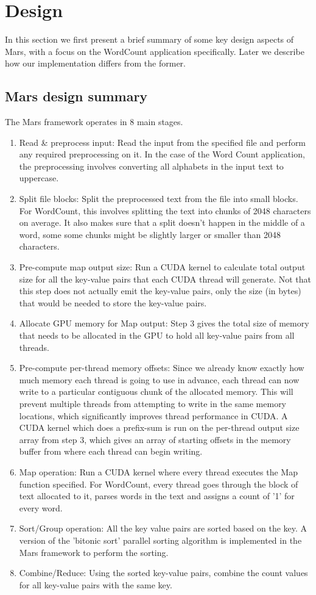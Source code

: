 \documentclass{article}
\begin{document}
\section{Design}
In this section we first present a brief summary of some key design aspects of Mars, with a focus on the WordCount application specifically. Later we describe how our implementation differs from the former.

\subsection{Mars design summary} \label{mars-design-summary}
The Mars framework operates in 8 main stages. 
\begin{enumerate}
    \item Read \& preprocess input: Read the input from the specified file and perform any required preprocessing on it. In the case of the Word Count application, the preprocessing involves converting all alphabets in the input text to uppercase. 
    \item Split file blocks: Split the preprocessed text from the file into small blocks. For WordCount, this involves splitting the text into chunks of 2048 characters on average. It also makes sure that a split doesn't happen in the middle of a word, some some chunks might be slightly larger or smaller than 2048 characters.
    \item Pre-compute map output size: Run a CUDA kernel to calculate total output size for all the key-value pairs that each CUDA thread will generate. Not that this step does not actually emit the key-value pairs, only the size (in bytes) that would be needed to store the key-value pairs. 
    \item Allocate GPU memory for Map output: Step 3 gives the total size of memory that needs to be allocated in the GPU to hold all key-value pairs from all threads. 
    \item Pre-compute per-thread memory offsets: Since we already know exactly how much memory each thread is going to use in advance, each thread can now write to a particular contiguous chunk of the allocated memory. This will prevent multiple threads from attempting to write in the same memory locations, which significantly improves thread performance in CUDA. A CUDA kernel which does a prefix-sum is run on the per-thread output size array from step 3, which gives an array of starting offsets in the memory buffer from where each thread can begin writing. 
    \item Map operation: Run a CUDA kernel where every thread executes the Map function specified. For WordCount, every thread goes through the block of text allocated to it, parses words in the text and assigns a count of '1' for every word.
    \item Sort/Group operation: All the key value pairs are sorted based on the key. A version of the 'bitonic sort' parallel sorting algorithm \cite{bitonic_sort} is implemented in the Mars framework to perform the sorting.
    \item Combine/Reduce: Using the sorted key-value pairs, combine the count values for all key-value pairs with the same key.
\end{enumerate}
\end{document}
